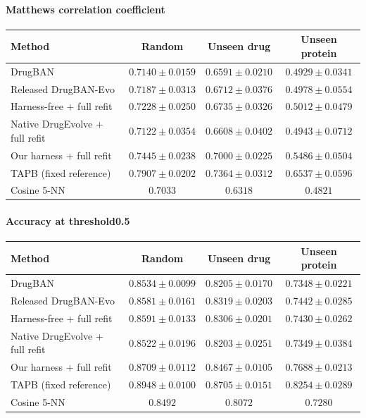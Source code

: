 \paragraph{Matthews correlation coefficient}
\begin{tabular}{lccc}
\toprule
Method & Random & Unseen drug & Unseen protein \\
\midrule
DrugBAN & $0.7140 \pm 0.0159$ & $0.6591 \pm 0.0210$ & $0.4929 \pm 0.0341$ \\
Released DrugBAN-Evo & $0.7187 \pm 0.0313$ & $0.6712 \pm 0.0376$ & $0.4978 \pm 0.0554$ \\
Harness-free + full refit & $0.7228 \pm 0.0250$ & $0.6735 \pm 0.0326$ & $0.5012 \pm 0.0479$ \\
Native DrugEvolve + full refit & $0.7122 \pm 0.0354$ & $0.6608 \pm 0.0402$ & $0.4943 \pm 0.0712$ \\
Our harness + full refit & $0.7445 \pm 0.0238$ & $0.7000 \pm 0.0225$ & $0.5486 \pm 0.0504$ \\
TAPB (fixed reference) & $0.7907 \pm 0.0202$ & $0.7364 \pm 0.0312$ & $0.6537 \pm 0.0596$ \\
Cosine 5-NN & $0.7033$ & $0.6318$ & $0.4821$ \\
\bottomrule
\end{tabular}

\paragraph{Accuracy at threshold0.5}
\begin{tabular}{lccc}
\toprule
Method & Random & Unseen drug & Unseen protein \\
\midrule
DrugBAN & $0.8534 \pm 0.0099$ & $0.8205 \pm 0.0170$ & $0.7348 \pm 0.0221$ \\
Released DrugBAN-Evo & $0.8581 \pm 0.0161$ & $0.8319 \pm 0.0203$ & $0.7442 \pm 0.0285$ \\
Harness-free + full refit & $0.8591 \pm 0.0133$ & $0.8306 \pm 0.0201$ & $0.7430 \pm 0.0262$ \\
Native DrugEvolve + full refit & $0.8522 \pm 0.0196$ & $0.8203 \pm 0.0251$ & $0.7349 \pm 0.0384$ \\
Our harness + full refit & $0.8709 \pm 0.0112$ & $0.8467 \pm 0.0105$ & $0.7688 \pm 0.0213$ \\
TAPB (fixed reference) & $0.8948 \pm 0.0100$ & $0.8705 \pm 0.0151$ & $0.8254 \pm 0.0289$ \\
Cosine 5-NN & $0.8492$ & $0.8072$ & $0.7280$ \\
\bottomrule
\end{tabular}
